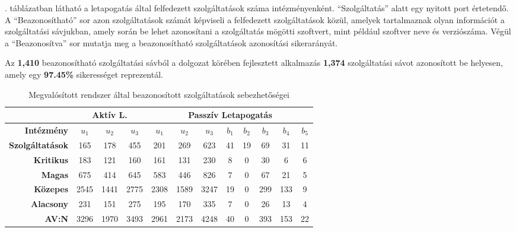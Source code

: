 	\Az{\ref{cpeids_hu}}. táblázatban látható a letapogatás által felfedezett szolgáltatások száma intézményenként. ``Szolgáltatás'' alatt egy nyitott port értetendő. A ``Beazonosítható'' sor azon szolgáltatások számát képviseli a felfedezett szolgáltatások közül, amelyek tartalmaznak olyan információt a szolgáltatási sávjukban, amely során be lehet azonosítani a szolgáltatás mögötti szoftvert, mint például szoftver neve és verziószáma. Végül a ``Beazonosítva'' sor mutatja meg a beazonosítható szolgáltatások azonosítási sikerarányát.
	
	Az \textbf{1,410} beazonosítható szolgáltatási sávból a dolgozat körében fejlesztett alkalmazás \textbf{1,374} szolgáltatási sávot azonosított be helyesen, amely egy \textbf{97.45\%} sikerességet reprezentál.
	
	\begin{table}[H]
		\centering
		\begin{tabular}{r|ccc|ccc|ccccc|}
			\cline{2-12}
			\multicolumn{1}{l|}{}                         & \multicolumn{3}{c|}{\textbf{Aktív L.}} & \multicolumn{8}{c|}{\textbf{Passzív Letapogatás}}                                                             \\ \hline
			\multicolumn{1}{|r|}{\textbf{Intézmény}}      & \textbf{$u_1$}    & \textbf{$u_2$}    & \textbf{$u_3$}   & \textbf{$u_1$} & \textbf{$u_2$} & \textbf{$u_3$} & \textbf{$b_1$} & \textbf{$b_2$} & \textbf{$b_3$} & \textbf{$b_4$} & \textbf{$b_5$} \\
			\multicolumn{1}{|r|}{\textbf{Szolgáltatások}} & 165            & 178            & 455           & 201         & 269         & 623         & 41          & 19          & 69          & 31          & 11          \\ \hline
			\multicolumn{1}{|r|}{\textbf{Kritikus}}       & 183            & 121            & 160           & 161         & 131         & 230         & 8           & 0           & 30          & 6           & 6           \\
			\multicolumn{1}{|r|}{\textbf{Magas}}          & 675            & 414            & 645           & 583         & 446         & 826         & 7           & 0           & 67          & 21          & 5           \\
			\multicolumn{1}{|r|}{\textbf{Közepes}}        & 2545           & 1441           & 2775          & 2308        & 1589        & 3247        & 19          & 0           & 299         & 133         & 9           \\
			\multicolumn{1}{|r|}{\textbf{Alacsony}}       & 231            & 151            & 275           & 195         & 170         & 335         & 7           & 0           & 26          & 13          & 4           \\
			\multicolumn{1}{|r|}{\textbf{AV:N}}           & 3296           & 1970           & 3493          & 2961        & 2173        & 4248        & 40          & 0           & 393         & 153         & 22          \\ \hline
		\end{tabular}
		\caption{Megvalósított rendszer által beazonosított szolgáltatások sebezhetőségei}
		\label{cpevulns_hu}
	\end{table}
	
